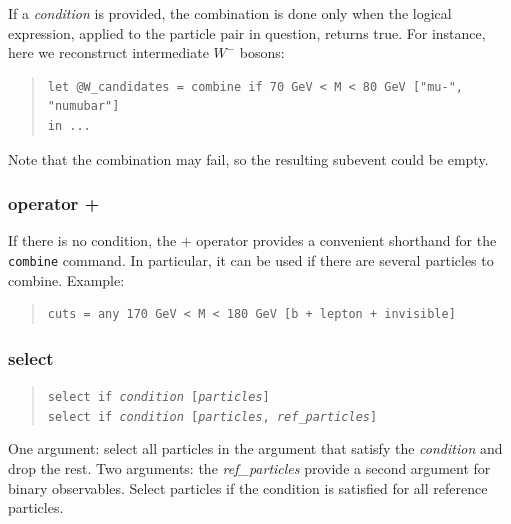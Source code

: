 \documentclass[12pt]{book}
\newcommand{\ttt}[1]{\texttt{#1}}
\begin{document}
If a \textit{condition} is provided, the combination is done only when the
logical expression, applied to the particle pair in question, returns true.
For instance, here we reconstruct intermediate $W^-$ bosons:
\begin{quote}
\begin{footnotesize}
\begin{verbatim}
let @W_candidates = combine if 70 GeV < M < 80 GeV ["mu-", "numubar"]
in ...
\end{verbatim}
\end{footnotesize}
\end{quote}
Note that the combination may fail, so the resulting subevent could be empty.


\subsubsection{operator +}

If there is no condition, the $+$ operator provides a convenient
shorthand for the \verb|combine| command.  In particular, it can be
used if there are several particles to combine.  Example:
\begin{quote}
\begin{footnotesize}
\begin{verbatim}
cuts = any 170 GeV < M < 180 GeV [b + lepton + invisible]
\end{verbatim}
\end{footnotesize}
\end{quote}


\subsubsection{select}
\begin{quote}
\begin{footnotesize}
  \ttt{select if \textit{condition} [\textit{particles}]}   \\
  \ttt{select if \textit{condition} [\textit{particles}, \textit{ref\_particles}]}
\end{footnotesize}
\end{quote}
One argument: select all particles in the argument that satisfy the
\textit{condition} and drop the rest.  Two arguments: the
\textit{ref\_particles} provide a second argument for binary observables.
Select particles if the condition is satisfied for all reference particles.
\end{document}
